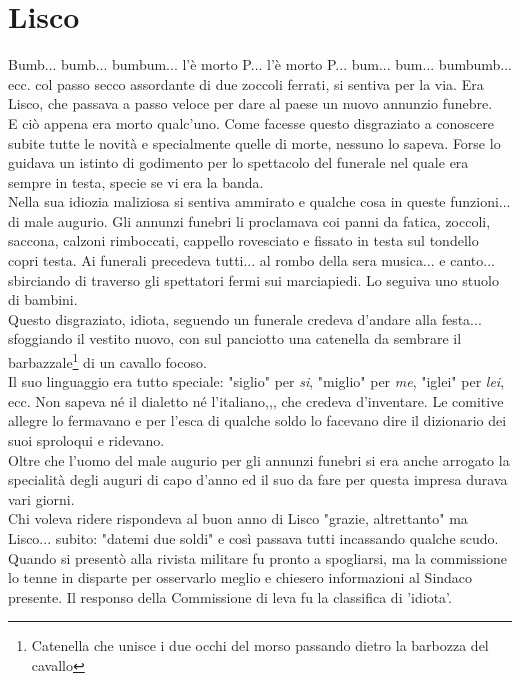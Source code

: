 \documentclass[10pt]{memoir} %
\begin{document}
\chapter{Lisco}
Bumb... bumb... bumbum... l'è morto P\:.\:.\:. l'è morto P\:.\:.\:. bum... bum... bumbumb... ecc. col passo secco assordante di due zoccoli ferrati, si sentiva per la via. Era Lisco, che passava a passo veloce per dare al paese un nuovo annunzio funebre.\\
E ciò appena era morto qualc'uno. Come facesse questo disgraziato a conoscere subite tutte le novità e specialmente quelle di morte, nessuno lo sapeva. Forse lo guidava un istinto di godimento per lo spettacolo del funerale nel quale era sempre in testa, specie se vi era la banda.\\
Nella sua idiozia maliziosa si sentiva ammirato e qualche cosa in queste funzioni... di male augurio. Gli annunzi funebri li proclamava coi panni da fatica, zoccoli, saccona, calzoni rimboccati, cappello rovesciato e fissato in testa sul tondello copri testa. Ai funerali precedeva tutti... al rombo della sera musica... e canto... sbirciando di traverso gli spettatori fermi sui marciapiedi. Lo seguiva uno stuolo di bambini.\\
Questo disgraziato, idiota, seguendo un funerale credeva d'andare alla festa... sfoggiando il vestito nuovo, con sul panciotto una catenella da sembrare il barbazzale\footnote{Catenella che unisce i due occhi del morso passando dietro la barbozza del cavallo} di un cavallo focoso.\\
Il suo linguaggio era tutto speciale: "siglio" per \emph{si}, "miglio" per \emph{me}, "iglei" per \emph{lei}, ecc. Non sapeva né il dialetto né l'italiano,,, che credeva d'inventare. Le comitive allegre lo fermavano e per l'esca di qualche soldo lo facevano dire il dizionario dei suoi sproloqui e ridevano.\\
Oltre che l'uomo del male augurio per gli annunzi funebri si era anche arrogato la specialità degli auguri di capo d'anno ed il suo da fare per questa impresa durava vari giorni.\\
Chi voleva ridere rispondeva al buon anno di Lisco "grazie, altrettanto" ma Lisco... subito: "datemi due soldi" e così passava tutti incassando qualche scudo.\\
Quando si presentò alla rivista militare fu pronto a spogliarsi, ma la commissione lo tenne in disparte per osservarlo meglio e chiesero informazioni al Sindaco presente. Il responso della Commissione di leva fu la classifica di 'idiota'.\\
\end{document}
